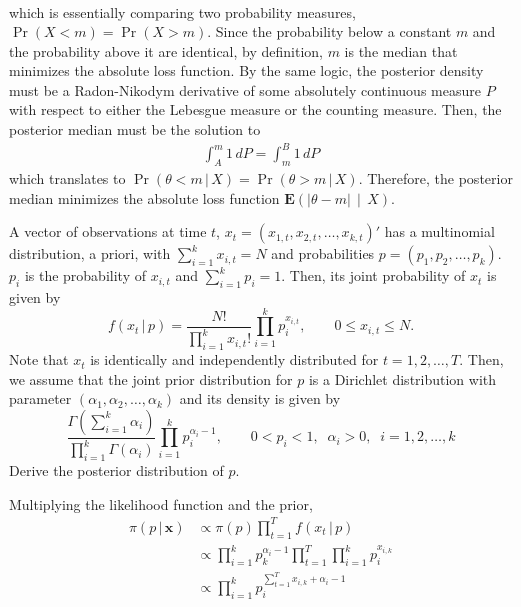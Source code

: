 \documentclass[answers]{exam}
\begin{document}
\begin{questions}
\begin{solution}
\begin{align}
    \end{align}
    which is essentially comparing two probability measures, $\Pr(X<m)=\Pr(X>m)$. Since the probability below a constant $m$ and the probability above it are identical, by definition, $m$ is the median that minimizes the absolute loss function. By the same logic, the posterior density must be a Radon-Nikodym derivative of some absolutely continuous measure $P$ with respect to either the Lebesgue measure or the counting measure. Then, the posterior median must be the solution to
    \begin{align}
      \int_{A}^{m}1\,dP = \int_{m}^{B}1\,dP
    \end{align}
    which translates to $\Pr(\theta < m\,|\,X)=\Pr(\theta>m\,|\,X)$.
    Therefore, the posterior median minimizes the absolute loss function $\mathbf{E}\left(\left|\theta-m\right|\,\middle|\,X\right)$.
  \end{solution}
  \question
  A vector of observations at time $t$, $x_{t}=(x_{1,t},x_{2,t},\ldots,x_{k,t})'$ has a multinomial distribution, a priori, with $\sum_{i=1}^{k}x_{i,t}=N$ and probabilities $p=(p_{1},p_{2},\ldots,p_{k})$. $p_{i}$ is the probability of $x_{i,t}$ and $\sum_{i=1}^{k}p_{i}=1$. Then, its joint probability of $x_{t}$ is given by
  \begin{equation}
    f(x_{t}\,|\,p) = \dfrac{N!}{\prod_{i=1}^{k}x_{i,t}!}\prod_{i=1}^{k}p_{i}^{x_{i,t}},\qquad 0\leq x_{i,t}\leq N.
  \end{equation}
  Note that $x_{t}$ is identically and independently distributed for $t=1,2,\ldots,T$. Then, we assume that the joint prior distribution for $p$ is a Dirichlet distribution with parameter $(\alpha_{1},\alpha_{2},\ldots,\alpha_{k})$ and its density is given by
  \begin{equation}
    \dfrac{\Gamma\left(\sum_{i=1}^{k}\alpha_{i}\right)}{\prod_{i=1}^{k}\Gamma(\alpha_{i})}\prod_{i=1}^{k}p_{i}^{\alpha_{i}-1},\qquad 0<p_{i}<1,\;\; \alpha_{i}>0,\;\; i=1,2,\ldots,k
  \end{equation}
  Derive the posterior distribution of $p$.
  \begin{solution}
    Multiplying the likelihood function and the prior,
    \begin{align}
      \pi\left(p\,|\,\mathbf{x}\right) &\propto \pi\left(p\right)\prod_{t=1}^{T}f(x_{t}\,|\,p)\\
      &\propto \prod_{i=1}^{k}p_{k}^{\alpha_{i}-1}\prod_{t=1}^{T}\prod_{i=1}^{k}p_{i}^{x_{i,k}}\\
      &\propto \prod_{i=1}^{k}p_{i}^{\sum_{t=1}^{T}x_{i,k}+\alpha_{i}-1}

\end{align}
\end{solution}
\end{questions}
\end{document}
